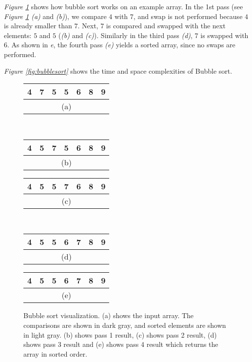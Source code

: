 \textit{Figure \ref{fig:bubblesort_ex}} shows how bubble sort works on an example array. In the 1st pass (see \textit{Figure \ref{fig:bubblesort_ex} (a)} and \textit{(b)}), we compare $4$ with $7$, and swap is not performed because $4$ is already smaller than $7$. Next, $7$ is compared and swapped with the next elements: $5$ and $5$ (\textit{(b)} and \textit{(c)}). Similarly in the third pass \textit{(d)}, $7$ is swapped with $6$. As shown in \textit{{e}}, the fourth pass \textit{(e)} yields a sorted array, since no swaps are performed. 

\textit{Figure \ref{fig:bubblesort}} shows the time and space complexities of Bubble sort.

\begin{figure}[!ht]
    \centering
    \begin{tabular}{|c|c|c|c|c|c|c|}
    \hline
    \cellcolor{gray}4 & \cellcolor{gray}7 & 5 & 5 & 6 & 8 & 9 \\
    \hline
    \multicolumn{7}{c}{(a)} \\
    \end{tabular}
    \,
    \begin{tabular}{|c|c|c|c|c|c|c|}
    \hline
    \cellcolor{lightgray}4 & \cellcolor{gray}5 & \cellcolor{gray}7 & 5 & 6 & 8 & 9 \\
    \hline
    \multicolumn{7}{c}{(b)} \\
    \end{tabular}
    \break
    \begin{tabular}{|c|c|c|c|c|c|c|}
    \hline
    \cellcolor{lightgray}4 & \cellcolor{lightgray}5 & \cellcolor{gray}5 & \cellcolor{gray}7 & 6 & 8 & 9 \\
    \hline
    \multicolumn{7}{c}{(c)} \\
    \end{tabular}
    \,
    \begin{tabular}{|c|c|c|c|c|c|c|}
    \hline
    \cellcolor{lightgray}4 & \cellcolor{lightgray}5 & \cellcolor{lightgray}5 & \cellcolor{gray}6 & \cellcolor{gray}7 & 8 & 9 \\
    \hline
    \multicolumn{7}{c}{(d)} \\
    \end{tabular}
    \break
    \begin{tabular}{|c|c|c|c|c|c|c|}
    \hline
    \cellcolor{lightgray}4 & \cellcolor{lightgray}5 & \cellcolor{lightgray}5 & \cellcolor{lightgray}6 & \cellcolor{lightgray}7 & \cellcolor{lightgray}8 & \cellcolor{lightgray}9 \\
    \hline
    \multicolumn{7}{c}{(e)} \\
    \end{tabular}
    
    \caption{Bubble sort visualization. (a) shows the input array. The comparisons are shown in dark gray, and sorted elements are shown in light gray. (b) shows pass 1 result, (c) shows pass 2 result, (d) shows pass 3 result and (e) shows pass 4 result which returns the array in sorted order.}
    \label{fig:bubblesort_ex}
\end{figure}

